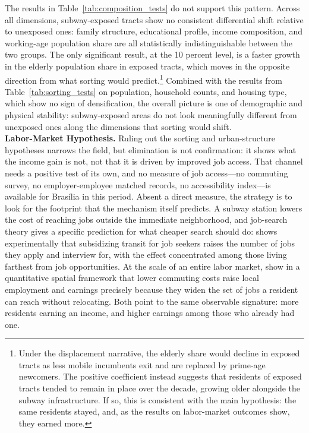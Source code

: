 The results in Table~\ref{tab:composition_tests} do not support this pattern. Across all dimensions, subway-exposed tracts show no consistent differential shift relative to unexposed ones: family structure, educational profile, income composition, and working-age population share are all statistically indistinguishable between the two groups. The only significant result, at the 10 percent level, is a faster growth in the elderly population share in exposed tracts, which moves in the opposite direction from what sorting would predict.\footnote{Under the displacement narrative, the elderly share would decline in exposed tracts as less mobile incumbents exit and are replaced by prime-age newcomers. The positive coefficient instead suggests that residents of exposed tracts tended to remain in place over the decade, growing older alongside the subway infrastructure. If so, this is consistent with the main hypothesis: the same residents stayed, and, as the results on labor-market outcomes show, they earned more.} Combined with the results from Table~\ref{tab:sorting_tests} on population, household counts, and housing type, which show no sign of densification, the overall picture is one of demographic and physical stability: subway-exposed areas do not look meaningfully different from unexposed ones along the dimensions that sorting would shift.\\

\noindent
\textbf{Labor-Market Hypothesis.} Ruling out the sorting and urban-structure hypotheses narrows the field, but elimination is not confirmation: it shows what the income gain is not, not that it is driven by improved job access. That channel needs a positive test of its own, and no measure of job access---no commuting survey, no employer-employee matched records, no accessibility index---is available for Brasília in this period. Absent a direct measure, the strategy is to look for the footprint that the mechanism itself predicts. A subway station lowers the cost of reaching jobs outside the immediate neighborhood, and job-search theory gives a specific prediction for what cheaper search should do: \citet{phillips2014gettingtowork} shows experimentally that subsidizing transit for job seekers raises the number of jobs they apply and interview for, with the effect concentrated among those living farthest from job opportunities. At the scale of an entire labor market, \citet{montereddingrossihansberg2018commuting} show in a quantitative spatial framework that lower commuting costs raise local employment and earnings precisely because they widen the set of jobs a resident can reach without relocating. Both point to the same observable signature: more residents earning an income, and higher earnings among those who already had one.

